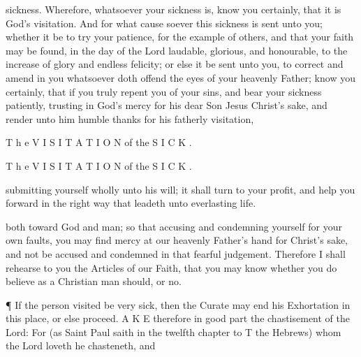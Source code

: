 sickness. Wherefore, whatsoever your sickness is, know you certainly, that it is God’s visitation. And for what cause soever this sickness is sent unto you; whether it be to try your patience, for the example of others, and that your faith may be found, in the day of the Lord laudable, glorious, and honourable, to the increase of glory and endless felicity; or else it be sent unto you, to correct and amend in you whatsoever doth offend the eyes of your heavenly Father; know you certainly, that if you truly repent you of your sins, and bear your sickness patiently, trusting in God’s mercy for his dear Son Jesus Christ’s sake, and render unto him humble thanks for his fatherly visitation,

T h e V I S I T A T I O N of the S I C K .

T h e V I S I T A T I O N of the S I C K .

submitting yourself wholly unto his will; it shall turn to your profit, and help you forward in the right way that leadeth unto everlasting life.

both toward God and man; so that accusing and condemning yourself for your own faults, you may find mercy at our heavenly Father’s hand for Christ’s sake, and not be accused and condemned in that fearful judgement. Therefore I shall rehearse to you the Articles of our Faith, that you may know whether you do believe as a Christian man should, or no.

¶ If the person visited be very sick, then the Curate may end his Exhortation in this place, or else proceed. A K E therefore in good part the chastisement of the Lord: For (as Saint Paul saith in the twelfth chapter to T the Hebrews) whom the Lord loveth he chasteneth, and


